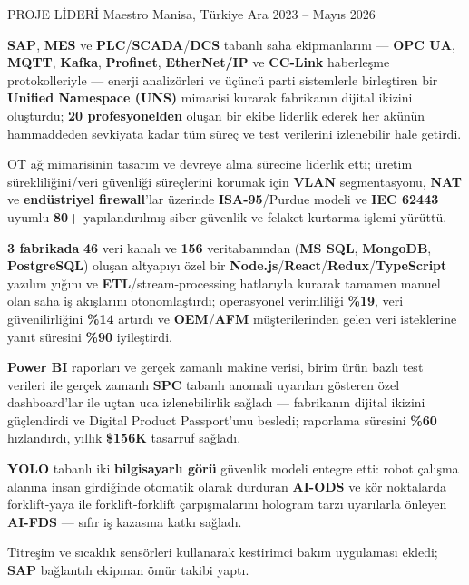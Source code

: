 \begin{cventries}
  \cventry
    {PROJE LİDERİ } %
{Maestro} %
    {Manisa, Türkiye} %
    {Ara 2023 – Mayıs 2026} %
    {
      \begin{cvitems} %
        \item {\textbf{SAP}, \textbf{MES} ve \textbf{PLC}/\textbf{SCADA}/\textbf{DCS} tabanlı saha ekipmanlarını --- \textbf{OPC UA}, \textbf{MQTT}, \textbf{Kafka}, \textbf{Profinet}, \textbf{EtherNet/IP} ve \textbf{CC-Link} haberleşme protokolleriyle --- enerji analizörleri ve üçüncü parti sistemlerle birleştiren bir \textbf{Unified Namespace (UNS)} mimarisi kurarak fabrikanın dijital ikizini oluşturdu; \textbf{20 profesyonelden} oluşan bir ekibe liderlik ederek her akünün hammaddeden sevkiyata kadar tüm süreç ve test verilerini izlenebilir hale getirdi.}
        \item {OT ağ mimarisinin tasarım ve devreye alma sürecine liderlik etti; üretim sürekliliğini/veri güvenliği süreçlerini korumak için \textbf{VLAN} segmentasyonu, \textbf{NAT} ve \textbf{endüstriyel firewall}'lar üzerinde \textbf{ISA-95}/Purdue modeli ve \textbf{IEC 62443} uyumlu \textbf{80+} yapılandırılmış siber güvenlik ve felaket kurtarma işlemi yürüttü.}
        \item {\textbf{3 fabrikada} \textbf{46} veri kanalı ve \textbf{156} veritabanından (\textbf{MS SQL}, \textbf{MongoDB}, \textbf{PostgreSQL}) oluşan altyapıyı özel bir \textbf{Node.js}/\textbf{React}/\textbf{Redux}/\textbf{TypeScript} yazılım yığını ve \textbf{ETL}/stream-processing hatlarıyla kurarak tamamen manuel olan saha iş akışlarını otonomlaştırdı; operasyonel verimliliği \textbf{\%19}, veri güvenilirliğini \textbf{\%14} artırdı ve \textbf{OEM}/\textbf{AFM} müşterilerinden gelen veri isteklerine yanıt süresini \textbf{\%90} iyileştirdi.}
        \item {\textbf{Power BI} raporları ve gerçek zamanlı makine verisi, birim ürün bazlı test verileri ile gerçek zamanlı \textbf{SPC} tabanlı anomali uyarıları gösteren özel dashboard'lar ile uçtan uca izlenebilirlik sağladı --- fabrikanın dijital ikizini güçlendirdi ve Digital Product Passport'unu besledi; raporlama süresini \textbf{\%60} hızlandırdı, yıllık \textbf{\$156K} tasarruf sağladı.}
        \item {\textbf{YOLO} tabanlı iki \textbf{bilgisayarlı görü} güvenlik modeli entegre etti: robot çalışma alanına insan girdiğinde otomatik olarak durduran \textbf{AI-ODS} ve kör noktalarda forklift-yaya ile forklift-forklift çarpışmalarını hologram tarzı uyarılarla önleyen \textbf{AI-FDS} --- sıfır iş kazasına katkı sağladı.}
        \item {Titreşim ve sıcaklık sensörleri kullanarak kestirimci bakım uygulaması ekledi; \textbf{SAP} bağlantılı ekipman ömür takibi yaptı.}
      \end{cvitems}
    }


\end{cventries}
